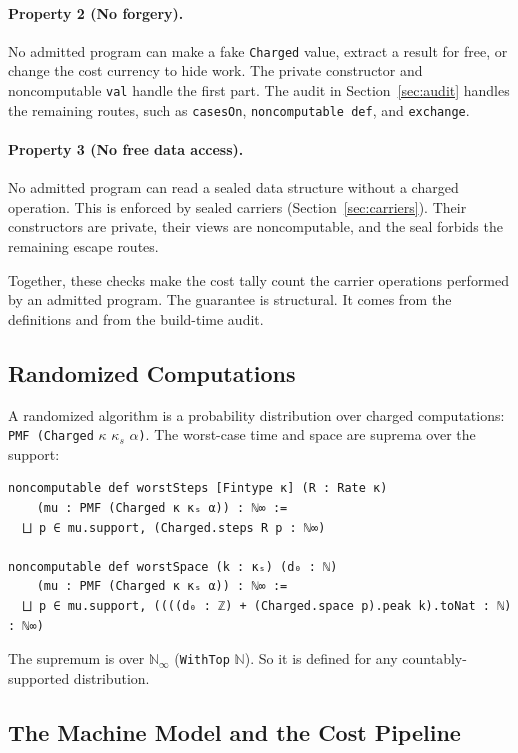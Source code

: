 \documentclass[acmsmall,nonacm]{acmart}
\begin{document}
\paragraph{Property 2 (No forgery).}
No admitted program can make a fake \lstinline{Charged} value, extract a result for free, or change the cost currency to hide work.
The private constructor and noncomputable \lstinline{val} handle the first part.
The audit in Section~\ref{sec:audit} handles the remaining routes, such as \lstinline{casesOn}, \lstinline{noncomputable def}, and \lstinline{exchange}.

\paragraph{Property 3 (No free data access).}
No admitted program can read a sealed data structure without a charged operation.
This is enforced by sealed carriers (Section~\ref{sec:carriers}).
Their constructors are private, their views are noncomputable, and the seal forbids the remaining escape routes.

Together, these checks make the cost tally count the carrier operations performed by an admitted program.
The guarantee is structural.
It comes from the definitions and from the build-time audit.

\subsection{Randomized Computations}\label{sec:randomised}

A randomized algorithm is a probability distribution over charged computations:
\lstinline{PMF (Charged} $\kappa$ $\kappa_s$ $\alpha$\lstinline{)}.
The worst-case time and space are suprema over the support:

\begin{lstlisting}
noncomputable def worstSteps [Fintype κ] (R : Rate κ)
    (mu : PMF (Charged κ κₛ α)) : ℕ∞ :=
  ⨆ p ∈ mu.support, (Charged.steps R p : ℕ∞)

noncomputable def worstSpace (k : κₛ) (d₀ : ℕ)
    (mu : PMF (Charged κ κₛ α)) : ℕ∞ :=
  ⨆ p ∈ mu.support, ((((d₀ : ℤ) + (Charged.space p).peak k).toNat : ℕ) : ℕ∞)
\end{lstlisting}

The supremum is over $\mathbb{N}_\infty$ (\lstinline{WithTop} $\mathbb{N}$).
So it is defined for any countably-supported distribution.

\subsection{The Machine Model and the Cost Pipeline}\label{sec:pipeline}
\end{document}
